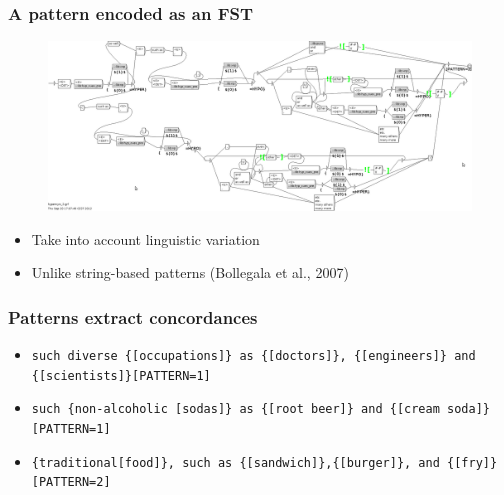 \begin{frame}
\frametitle{A pattern encoded as an FST}

\begin{figure}  
    \centering
        \includegraphics[width=1.0\textwidth]{figures/pattern2}
    \end{figure}

\begin{itemize}
  \item Take into account linguistic variation
  \item Unlike string-based patterns (Bollegala et al., 2007)
    
\end{itemize}

\end{frame}






\begin{frame}
\frametitle{Patterns extract concordances}

\begin{itemize}
  \item \texttt{such diverse \{[occupations]\} as
  \{[doctors]\}, \{[engineers]\} and \{[scientists]\}[PATTERN=1]}
  \item \texttt{such \{non-alcoholic [sodas]\} as \{[root beer]\} and \{[cream soda]\}[PATTERN=1]}
  \item \texttt{\{traditional[food]\}, such as \{[sandwich]\},\{[burger]\}, and \{[fry]\}[PATTERN=2]}
\end{itemize}

\end{frame}






